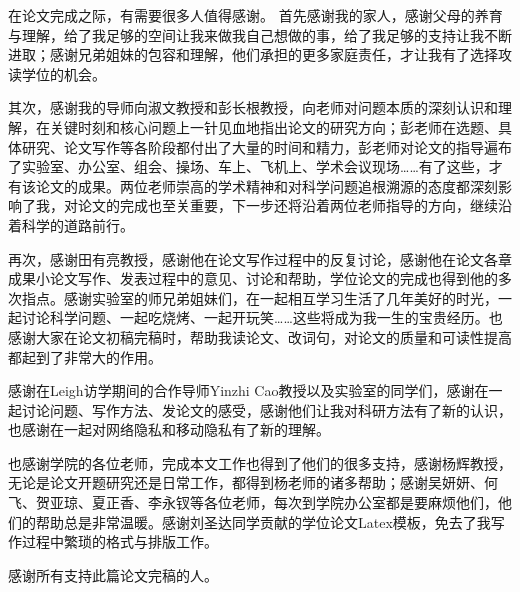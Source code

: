 \begin{thanks}
	
	在论文完成之际，有需要很多人值得感谢。
	首先感谢我的家人，感谢父母的养育与理解，给了我足够的空间让我来做我自己想做的事，给了我足够的支持让我不断进取；感谢兄弟姐妹的包容和理解，他们承担的更多家庭责任，才让我有了选择攻读学位的机会。
	
	其次，感谢我的导师向淑文教授和彭长根教授，向老师对问题本质的深刻认识和理解，在关键时刻和核心问题上一针见血地指出论文的研究方向；彭老师在选题、具体研究、论文写作等各阶段都付出了大量的时间和精力，彭老师对论文的指导遍布了实验室、办公室、组会、操场、车上、飞机上、学术会议现场……有了这些，才有该论文的成果。两位老师崇高的学术精神和对科学问题追根溯源的态度都深刻影响了我，对论文的完成也至关重要，下一步还将沿着两位老师指导的方向，继续沿着科学的道路前行。
	
	再次，感谢田有亮教授，感谢他在论文写作过程中的反复讨论，感谢他在论文各章成果小论文写作、发表过程中的意见、讨论和帮助，学位论文的完成也得到他的多次指点。感谢实验室的师兄弟姐妹们，在一起相互学习生活了几年美好的时光，一起讨论科学问题、一起吃烧烤、一起开玩笑……这些将成为我一生的宝贵经历。也感谢大家在论文初稿完稿时，帮助我读论文、改词句，对论文的质量和可读性提高都起到了非常大的作用。
	
	感谢在Leigh访学期间的合作导师Yinzhi Cao教授以及实验室的同学们，感谢在一起讨论问题、写作方法、发论文的感受，感谢他们让我对科研方法有了新的认识，也感谢在一起对网络隐私和移动隐私有了新的理解。
	
	也感谢学院的各位老师，完成本文工作也得到了他们的很多支持，感谢杨辉教授，无论是论文开题研究还是日常工作，都得到杨老师的诸多帮助；感谢吴妍妍、何飞、贺亚琼、夏正香、李永钗等各位老师，每次到学院办公室都是要麻烦他们，他们的帮助总是非常温暖。感谢刘圣达同学贡献的学位论文Latex模板，免去了我写作过程中繁琐的格式与排版工作。
	
	感谢所有支持此篇论文完稿的人。
	
	
\end{thanks}